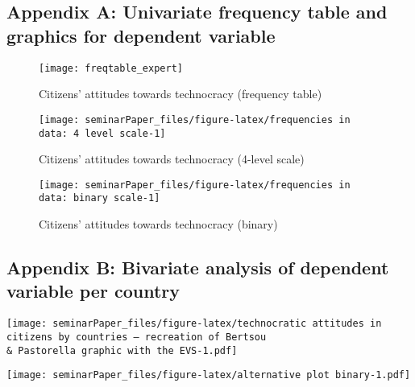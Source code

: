 \documentclass[
  12pt,
  english,
]{article}
\begin{document}
\hypertarget{appendix-a-univariate-frequency-table-and-graphics-for-dependent-variable}{%
\subsection{Appendix A: Univariate frequency table and graphics for
dependent
variable}\label{appendix-a-univariate-frequency-table-and-graphics-for-dependent-variable}}

\begin{figure}

{\centering \texttt{[image: freqtable\_expert]} 

}

\caption{Citizens' attitudes towards technocracy (frequency table)}\label{fig:frequency table expert}
\end{figure}

\begin{figure}

{\centering \texttt{[image: seminarPaper\_files/figure-latex/frequencies in data: 4 level scale-1]} 

}

\caption{Citizens' attitudes towards technocracy (4-level scale)}\label{fig:frequencies in data: 4 level scale}
\end{figure}

\begin{figure}

{\centering \texttt{[image: seminarPaper\_files/figure-latex/frequencies in data: binary scale-1]} 

}

\caption{Citizens' attitudes towards technocracy (binary)}\label{fig:frequencies in data: binary scale}
\end{figure}

\hypertarget{appendix-b-bivariate-analysis-of-dependent-variable-per-country}{%
\subsection{Appendix B: Bivariate analysis of dependent variable per
country}\label{appendix-b-bivariate-analysis-of-dependent-variable-per-country}}

\texttt{[image: seminarPaper\_files/figure-latex/technocratic attitudes in citizens by countries --- recreation of Bertsou \\\& Pastorella graphic with the EVS-1.pdf]}

\texttt{[image: seminarPaper\_files/figure-latex/alternative plot binary-1.pdf]}
\end{document}
